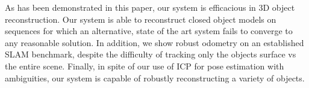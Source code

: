 As has been demonstrated in this paper, our system is efficacious in 3D object 
reconstruction. Our system is able to reconstruct closed object models on sequences for which an alternative, state of 
the art system \cite{Ren2013} fails to converge to any reasonable solution. In addition, we show robust odometry on an 
established SLAM benchmark, despite the difficulty of tracking only the objects surface vs the entire scene. Finally,
in spite of our use of ICP for pose estimation with ambiguities, our system is capable of robustly reconstructing a 
variety of objects.